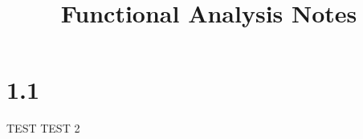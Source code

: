 \documentclass[12pt]{article}
\title{Functional Analysis Notes}
\begin{document}
	
	\maketitle
	
\section*{1.1}
	
	{\Huge TEST}
	{\Huge TEST 2}
	
	
	
	
\end{document}
